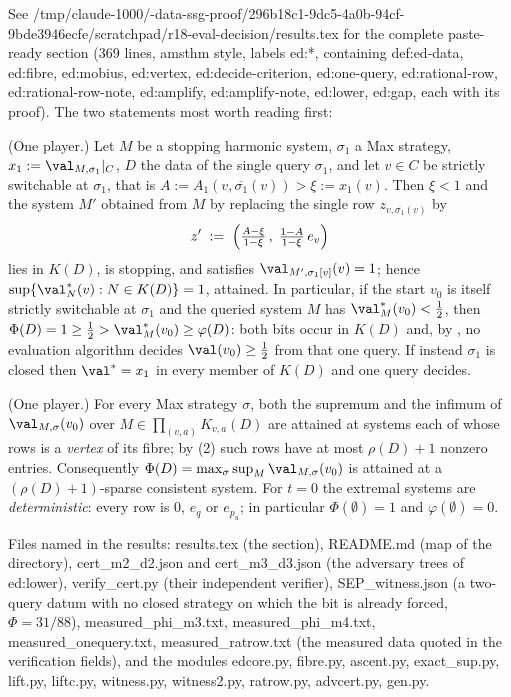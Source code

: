 See /tmp/claude-1000/-data-ssg-proof/296b18c1-9dc5-4a0b-94cf-9bde3946ecfe/scratchpad/r18-eval-decision/results.tex for the complete paste-ready section (369 lines, amsthm style, labels ed:*, containing def:ed-data, ed:fibre, ed:mobius, ed:vertex, ed:decide-criterion, ed:one-query, ed:rational-row, ed:rational-row-note, ed:amplify, ed:amplify-note, ed:lower, ed:gap, each with its proof). The two statements most worth reading first:

\begin{theorem}\label{ed:one-query}
(One player.)  Let $M$ be a stopping harmonic system, $\sigma_1$ a Max strategy, $x_1:=\val_{M,\sigma_1}|_C$, $D$ the data of the single query $\sigma_1$, and let $v\in C$ be strictly switchable at $\sigma_1$, that is $A:=A_1(v,\overline{\sigma_1}(v))>\xi:=x_1(v)$.  Then $\xi<1$ and the system $M'$ obtained from $M$ by replacing the single row $z_{v,\overline{\sigma_1}(v)}$ by
\[ z' \;:=\;\Bigl(\tfrac{A-\xi}{1-\xi}\,,\;\tfrac{1-A}{1-\xi}\,e_v\Bigr) \]
lies in $K(D)$, is stopping, and satisfies $\val_{M',\sigma_1[v]}(v)=1$; hence $\sup\{\val^{\ast}_N(v):N\in K(D)\}=1$, attained.  In particular, if the start $v_0$ is itself strictly switchable at $\sigma_1$ and the queried system $M$ has $\val^{\ast}_M(v_0)<\tfrac12$, then $\Phi(D)=1\ge\tfrac12>\val^{\ast}_M(v_0)\ge\varphi(D)$: both bits occur in $K(D)$ and, by , no evaluation algorithm decides $\val(v_0)\ge\tfrac12$ from that one query.  If instead $\sigma_1$ is closed then $\val^{\ast}=x_1$ in every member of $K(D)$ and one query decides.
\end{theorem}

\begin{proposition}\label{ed:vertex}
(One player.)  For every Max strategy $\sigma$, both the supremum and the infimum of $\val_{M,\sigma}(v_0)$ over $M\in\prod_{(v,a)}K_{v,a}(D)$ are attained at systems each of whose rows is a \emph{vertex} of its fibre; by (2) such rows have at most $\rho(D)+1$ nonzero entries.  Consequently $\Phi(D)=\max_\sigma\sup_M\val_{M,\sigma}(v_0)$ is attained at a $(\rho(D)+1)$-sparse consistent system.  For $t=0$ the extremal systems are \emph{deterministic}: every row is $0$, $e_q$ or $e_{p_u}$; in particular $\Phi(\emptyset)=1$ and $\varphi(\emptyset)=0$.
\end{proposition}

Files named in the results: results.tex (the section), README.md (map of the directory), cert_m2_d2.json and cert_m3_d3.json (the adversary trees of ed:lower), verify_cert.py (their independent verifier), SEP_witness.json (a two-query datum with no closed strategy on which the bit is already forced, $\Phi=31/88$), measured_phi_m3.txt, measured_phi_m4.txt, measured_onequery.txt, measured_ratrow.txt (the measured data quoted in the verification fields), and the modules edcore.py, fibre.py, ascent.py, exact_sup.py, lift.py, liftc.py, witness.py, witness2.py, ratrow.py, advcert.py, gen.py.